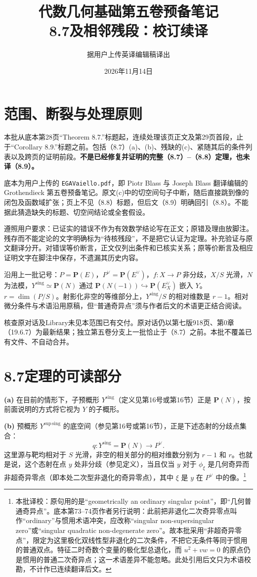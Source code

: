 \documentclass{ctexbook}
\title{代数几何基础第五卷预备笔记\\8.7及相邻残段：校订续译}
\author{据用户上传英译编辑稿译出}
\date{2026年11月14日}
\newcommand{\corr}[1]{\footnote{本批译校：#1}}
\newcommand{\Ys}{Y^{\mathrm{sing}}}
\newcommand{\Yss}{Y^{\mathrm{sup\,sing}}}
\begin{document}
\maketitle
\frontmatter
\chapter*{范围、断裂与处理原则}
本批从底本第28页“Theorem 8.7.”标题起，连续处理该页正文及第29页首段，止于“Corollary 8.9.”标题之前。包括（8.7）(a)、(b)、残缺的(c)、紧随其后的条件列表以及跨页的证明前段。\textbf{不是已经修复并证明的完整（8.7）--（8.8）定理，也未译（8.9）。}

底本为用户上传的 \texttt{EGAVaiello.pdf}，即 Piotr Blass 与 Joseph Blass 翻译编辑的 Grothendieck 第五卷预备笔记。原文(c)中的切空间句子中断，随后直接跳到像的闭包及函数域扩张；页上不见（8.8）标题，但后文（8.9）明确回引（8.8）。不能据此猜造缺失的标题、切空间结论或全套假设。

遵照用户要求：已证实的错误不作为有效数学结论写在正文；原错及理由放脚注。残存而不能定论的文字明确标为“待核残段”，不是把它认证为定理。补充验证与原文翻译分开。对错误等价断言，正文仅列出条件和已核实关系；原等价断言及相应证明文字在脚注中保存，不遗漏其历史内容。

沿用上一批记号：$P=\mathbf P(E)$，$P^\vee=\mathbf P(E^\vee)$，$f:X\to P$ 非分歧，$X/S$ 光滑，$N$ 为法模，$\Ys\simeq\mathbf P(N)$ 通过 $\mathbf P(N(-1))\hookrightarrow\mathbf P(E_X^\vee)$ 嵌入 $Y$。$r=\dim(P/S)$。射影化非空的等维部分上，$\Ys/S$ 的相对维数是 $r-1$。相对微分条件与术语沿用原稿，但“普通奇异点”须与作者后文的术语更正结合阅读。

核查原对话及Library未见本范围已有交付。原对话仍以第七版918页、第0章（19.6.7）为最新结果；独立第五卷分支上一批恰止于（8.7）之前。本批不覆盖已有文件、不自动合并。
\mainmatter
\chapter*{8.7\quad 定理的可读部分}
\noindent\textbf{(a)} 在目前的情形下，子预概形 $\Ys$（定义见第16号或第16节）正是 $\mathbf P(N)$，按前面说明的方式将它视为 $Y$ 的子概形。

\noindent\textbf{(b)} 预概形 $\Yss$ 的底空间（参见第16号或第16节），正是下述态射的分歧点集合：
\[
q:\Ys=\mathbf P(N)\longrightarrow P^\vee.
\]
这里源与靶均相对于 $S$ 光滑，非空的相关部分的相对维数分别为 $r-1$ 和 $r$。也就是说，这个态射在点 $y$ 处非分歧（参见定义），当且仅当 $y$ 对于 $\phi_\xi$ 是几何奇异而非超奇异零点（即本处二次型非退化的奇异零点），其中 $\xi$ 是 $y$ 在 $P^\vee$ 中的像。\corr{原句用的是“geometrically an ordinary singular point”，即“几何普通奇异点”。底本第73--74页作者另行说明：此前把非退化二次奇异零点叫作“ordinary”与惯用术语冲突，应改称“singular non-supersingular zero”或“singular quadratic non-degenerate zero”。故本批采用“非超奇异零点”，限定为这里极化双线性型非退化的二次条件，不把它无条件等同于惯用的普通双点。特征二时奇数个变量的极化型总退化，而 $u^2+vw=0$ 的原点仍是惯用的普通二次奇异点；这一术语差异不能忽略。此处引用后文只为术语校勘，不计作已连续翻译后文。}
\end{document}
